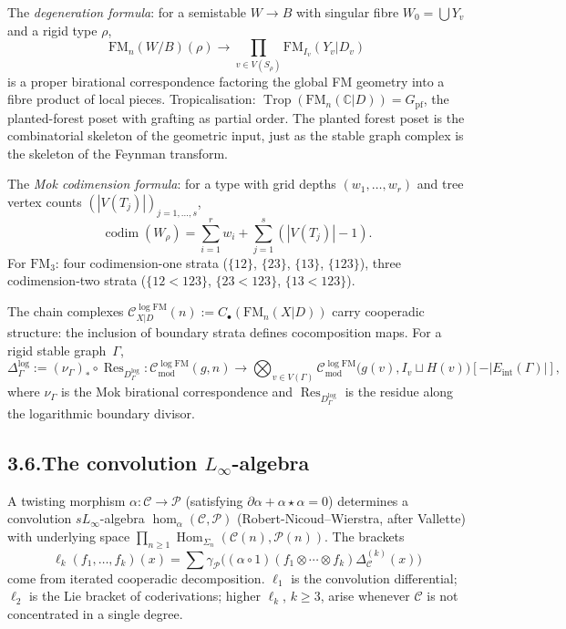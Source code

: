 \documentclass[11pt]{report}
\theoremstyle{definition}
\theoremstyle{remark}
\providecommand{\cC}{\mathcal{C}}
\providecommand{\cP}{\mathcal{P}}
\DeclareMathOperator{\Hom}{Hom}
\numberwithin{equation}{section}
\begin{document}
The \emph{degeneration formula}: for a semistable $W\to B$ with
singular fibre $W_0=\bigcup Y_v$ and a rigid type $\rho$,
\[
\mathrm{FM}_n(W/B)(\rho)\longrightarrow\prod_{v\in V(S_\rho)}\mathrm{FM}_{I_v}(Y_v|D_v)
\]
is a proper birational correspondence factoring the global FM
geometry into a fibre product of local pieces. Tropicalisation:
$\operatorname{Trop}(\mathrm{FM}_n(\mathbb C|D))=G_{\mathrm{pf}}$, the
planted-forest poset with grafting as partial order. The planted
forest poset is the combinatorial skeleton of the geometric input,
just as the stable graph complex is the skeleton of the Feynman
transform.

The \emph{Mok codimension formula}: for a type with grid depths
$(w_1,\ldots,w_r)$ and tree vertex counts $(|V(T_j)|)_{j=1,\ldots,s}$,
\[
\operatorname{codim}(W_\rho)=\sum_{i=1}^r w_i+\sum_{j=1}^s(|V(T_j)|-1).
\]
For $\mathrm{FM}_3$: four codimension-one strata ($\{12\}$, $\{23\}$,
$\{13\}$, $\{123\}$), three codimension-two strata
($\{12{<}123\}$, $\{23{<}123\}$, $\{13{<}123\}$).

The chain complexes $\cC^{\log\mathrm{FM}}_{X|D}(n):=C_\bullet(\mathrm{FM}_n(X|D))$
carry cooperadic structure: the inclusion of boundary strata defines
cocomposition maps. For a rigid stable graph~$\Gamma$,
\[
\Delta^{\log}_\Gamma:=(\nu_\Gamma)_*\circ\operatorname{Res}_{D^{\log}_\Gamma}\colon\cC^{\log\mathrm{FM}}_{\mathrm{mod}}(g,n)\to\bigotimes_{v\in V(\Gamma)}\cC^{\log\mathrm{FM}}_{\mathrm{mod}}\bigl(g(v),I_v\sqcup H(v)\bigr)[-|E_{\mathrm{int}}(\Gamma)|],
\]
where $\nu_\Gamma$ is the Mok birational correspondence and
$\operatorname{Res}_{D^{\log}_\Gamma}$ is the residue along the
logarithmic boundary divisor.

\subsection*{3.6.\enspace The convolution $L_\infty$-algebra}

A twisting morphism $\alpha\colon\cC\to\cP$ (satisfying
$\partial\alpha+\alpha\star\alpha=0$) determines a convolution
$sL_\infty$-algebra $\operatorname{hom}_\alpha(\cC,\cP)$
(Robert-Nicoud--Wierstra, after Vallette) with underlying space
$\prod_{n\ge 1}\Hom_{\Sigma_n}(\cC(n),\cP(n))$. The brackets
\[
\ell_k(f_1,\ldots,f_k)(x)=\sum\gamma_\cP\bigl((\alpha\circ 1)(f_1\otimes\cdots\otimes f_k)\Delta^{(k)}_\cC(x)\bigr)
\]
come from iterated cooperadic decomposition. $\ell_1$ is the
convolution differential; $\ell_2$ is the Lie bracket of
coderivations; higher $\ell_k$, $k\ge 3$, arise whenever $\cC$ is not
concentrated in a single degree.
\end{document}
